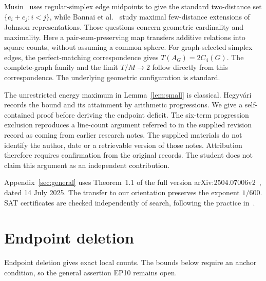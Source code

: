 \documentclass[11pt,a4paper]{article}
\newif\ifshowrevisions
\newenvironment{revision}{\par\begingroup\ifshowrevisions\color{red}\fi}{\par\endgroup}
\theoremstyle{definition}
\numberwithin{equation}{section}
\begin{document}
\begin{revision}
Musin~\cite{Musin09} uses regular-simplex edge midpoints to give the
standard two-distance set $\{e_i+e_j:i<j\}$, while Bannai et
al.~\cite{BSS12} study maximal few-distance extensions of Johnson
representations. Those questions concern geometric cardinality and
maximality. Here a pair-sum-preserving map transfers additive
relations into square counts, without assuming a common sphere.
For graph-selected simplex edges, the perfect-matching correspondence
gives $T(A_G)=2C_4(G)$. The complete-graph family and the limit
$T/M\to2$ follow directly from this correspondence. The underlying
geometric configuration is standard.
\end{revision}
\begin{revision}
The unrestricted energy maximum in Lemma~\ref{lem:small} is classical. Hegyv\'ari~\cite[Introduction]{Heg23} records the bound and its attainment by arithmetic progressions. We give a self-contained proof before deriving the endpoint deficit. The six-term progression exclusion reproduces a line-count argument referred to in the supplied revision record as coming from earlier research notes. The supplied materials do not identify the author, date or a retrievable version of those notes. Attribution therefore requires confirmation from the original records. The student does not claim this argument as an independent contribution. 
\end{revision}

Appendix~\ref{sec:general} uses Theorem~1.1 of the full version arXiv:2504.07006v2~\cite{JLLOS25}, dated 14 July 2025. The transfer to our orientation preserves the exponent $1/600$. SAT certificates are checked independently of search, following the practice in~\cite{HKM16}.

\section{Endpoint deletion}\label{app:endpoint}
Endpoint deletion gives exact local counts. The bounds below require an anchor condition, so the general assertion EP10 remains open.
\end{document}
